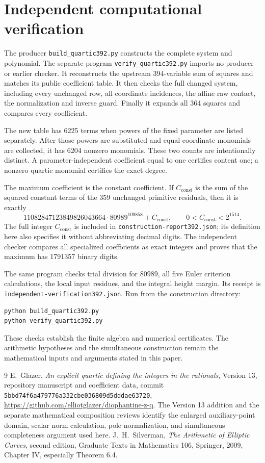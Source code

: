 \documentclass[11pt,a4paper]{article}
\theoremstyle{definition}\newtheorem{definition}[theorem]{Definition}
\theoremstyle{remark}\newtheorem{remark}[theorem]{Remark}
\begin{document}
\section{Independent computational verification}
The producer \nolinkurl{build_quartic392.py} constructs the complete
system and polynomial. The separate program
\nolinkurl{verify_quartic392.py} imports no producer or earlier checker.
It reconstructs the upstream 394-variable sum of squares and matches
its public coefficient table. It then checks the full changed system,
including every unchanged row, all coordinate incidences, the affine
raw contact, the normalization and inverse guard. Finally it expands
all 364 squares and compares every coefficient.

The new table has 6225 terms when powers of the fixed parameter are
listed separately. After those powers are substituted and equal
coordinate monomials are collected, it has 6204 nonzero monomials.
These two counts are intentionally distinct. A parameter-independent
coefficient equal to one certifies content one; a nonzero quartic
monomial certifies the exact degree.

The maximum coefficient is the constant coefficient. If $C_{\mathrm{const}}$ is the
sum of the squared constant terms of the 359 unchanged primitive
residuals, then it is exactly
\[
       11082847123849826043664\cdot80989^{109858}+C_{\mathrm{const}},
       \qquad 0<C_{\mathrm{const}}<2^{1514}.
\]
The full integer $C_{\mathrm{const}}$ is included in
\nolinkurl{construction-report392.json}; its definition here also
specifies it without abbreviating decimal digits. The independent
checker compares all specialized coefficients as exact integers and
proves that the maximum has 1791357 binary digits.

The same program checks trial division for $80989$, all five Euler
criterion calculations, the local input residues, and the integral
height margin. Its receipt is
\nolinkurl{independent-verification392.json}.
Run from the construction directory:
\begin{verbatim}
python build_quartic392.py
python verify_quartic392.py
\end{verbatim}
These checks establish the finite algebra and numerical certificates.
The arithmetic hypotheses and the simultaneous construction remain
the mathematical inputs and arguments stated in this paper.

\begin{thebibliography}{9}
E.~Glazer, \emph{An explicit quartic defining the integers in the
rationals}, Version 13, repository manuscript and coefficient data,
commit \nolinkurl{5bbd74f6a479776a332cbe036809d5dddae63720},
\url{https://github.com/elliotglazer/diophantine-z-q}.
The Version 13 addition and the separate mathematical composition
reviews identify the enlarged auxiliary-point domain, scalar norm
calculation, pole normalization, and simultaneous completeness
argument used here.
J.~H.~Silverman, \emph{The Arithmetic of Elliptic Curves}, second
edition, Graduate Texts in Mathematics 106, Springer, 2009,
Chapter IV, especially Theorem 6.4.
\end{thebibliography}
\end{document}
